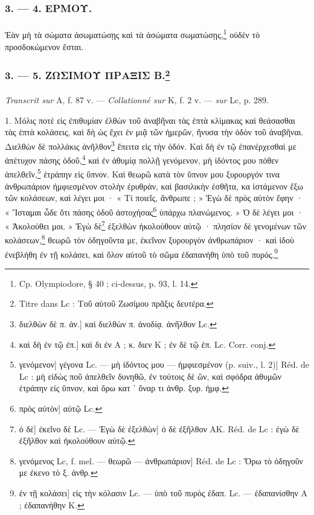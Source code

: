 \documentclass[a4paper, 11pt, oneside, polutonikogreek, french]{article}
\begin{document}
\bigskip
\centerline{\EightStarTaper}
\centerline{\EightStarTaper\EightStarTaper}
\bigskip

\subsubsection{3. --- 4. ΕΡΜΟΥ.}
\paragraph{}
Ἐὰν μὴ τὰ σώματα ἀσωματώσῃς καὶ τὰ ἀσώματα σωματώσῃς,\footnote{Cp. Olympiodore, § 40 ; ci-dessus, p. 93, l. 14.} οὐδὲν τὸ προσδοκώμενον ἔσται.

\bigskip
\centerline{\EightStarTaper}
\centerline{\EightStarTaper\EightStarTaper}
\bigskip

\subsubsection[3. --- 5. ΖΩΣΙΜΟΥ ΠΡΑΞΙΣ Β.]{3. --- 5. ΖΩΣΙΜΟΥ ΠΡΑΞΙΣ Β.\footnote{Titre dans Lc : Τοῦ αὐτοῦ Ζωσίμου πρᾶξις δευτέρα.}}
\paragraph{}
\emph{Transcrit sur} A, f. 87 v. --- \emph{Collationné sur} K, f. 2 v. --- \emph{sur} Lc, p. 289.

\bigskip

1. Μόλις ποτὲ εἰς ἐπιθυμίαν ἐλθὼν τοῦ ἀναβῆναι τὰς ἑπτὰ κλίμακας καὶ θεάσασθαι τὰς ἑπτὰ κολάσεις, καὶ δὴ ὡς ἔχει ἐν μιᾷ τῶν ἡμερῶν, ἤνυσα τὴν ὁδὸν τοῦ ἀναβῆναι. Διελθὼν δὲ πολλάκις ἀνῆλθον\footnote{διελθὼν δὲ π. ἀν.] καὶ διελθὼν π. ἀνοδίᾳ. ἀνῆλθον Lc.} ἔπειτα εἰς τὴν ὁδόν. Καὶ δὴ ἐν τῷ ἐπανέρχεσθαί με ἀπέτυχον πάσης ὁδοῦ,\footnote{καὶ δὴ ἐν τῷ ἐπ.] καὶ δι ἐν A ; κ. διεν K ; ἐν δὲ τῷ ἐπ. Lc. Corr. conj.} καὶ ἐν ἀθυμίᾳ πολλῇ γενόμενον, μὴ ἰδόντος μου πόθεν ἀπελθεῖν,\footnote{γενόμενον] γέγονα Lc. --- μὴ ἰδόντος μου --- ἠμφιεσμένον (p. suiv., l. 2)] Réd. de Lc : μὴ εἰδὼς ποῦ ἀπελθεῖν δυνηθῶ, ἐν τούτοις δὲ ὢν, καὶ σφόδρα ἀθυμῶν ἐτράπην εἰς ὕπνον, καὶ ὅρω κατ ᾽ ὄναρ τι ἀνθρ. ξυρ. ἠμφ.} ἐτράπην εἰς ὕπνον. Καὶ θεωρῶ κατὰ τὸν ὕπνον μου ξυρουργόν τινα ἀνθρωπάριον ἠμφιεσμένον στολὴν ἐρυθρὰν, καὶ βασιλικὴν ἐσθῆτα, κα ἱστάμενον ἔξω τῶν κολάσεων, καὶ λέγει μοι · « Τί ποιεῖς, ἄνθρωπε ; » Ἐγὼ δὲ πρὸς αὐτὸν ἔφην · « Ἵσταμαι ὧδε ὅτι πάσης ὁδοῦ ἀστοχήσας\footnote{πρὸς αὐτὸν] αὐτῷ Lc.} ὑπάρχω πλανώμενος. » Ὁ δὲ λέγει μοι · « Ἀκολούθει μοι. » Ἐγὼ δὲ\footnote{ὁ δὲ] ἐκεῖνο δὲ Lc. --- Ἐγὼ δὲ ἐξελθὼν] ὁ δὲ ἐξῆλθον AK. Réd. de Lc : ἐγὼ δὲ ἐξῆλθον καὶ ἠκολούθουν αὐτῷ.} ἐξελθὼν ἠκολούθουν αὐτῷ · πλησίον δὲ γενομένων τῶν κολάσεων,\footnote{γενόμενος Lc, f. mel. --- θεωρῶ --- ἀνθρωπάριον] Réd. de Lc : Ὅρω τὸ ὁδηγοῦν με ἐκενο τὸ ξ. ἀνθρ.} θεωρῶ τὸν ὁδηγοῦντα με, ἐκεῖνον ξυρουργὸν ἀνθρωπάριον · καὶ ἰδοὺ ἐνεβλήθη ἐν τῇ κολάσει, καὶ ὅλον αὐτοῦ τὸ σῶμα ἐδαπανήθη ὑπὸ τοῦ πυρός.\footnote{ἐν τῇ κολάσει] εἰς τὴν κόλασιν Lc. --- ὑπὸ τοῦ πυρὸς ἐδαπ. Lc. --- ἐδαπανίσθην A ; ἐδαπανήθην K.}
\end{document}
